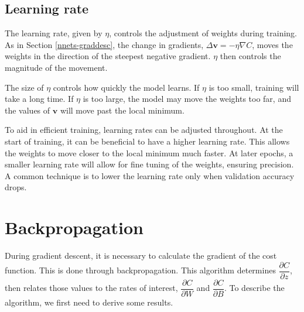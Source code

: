 %
%
%

\subsection*{Learning rate}\label{nnets-learningrate}

The learning rate, given by $\eta$, controls the adjustment of weights during training. As in Section \ref{nnets-graddesc}, the change in gradients, $\Delta\mathbf{v} = -\eta\nabla C$, moves the weights in the direction of the steepest negative gradient. $\eta$ then controls the magnitude of the movement.

The size of $\eta$ controls how quickly the model learns. If $\eta$ is too small, training will take a long time. If $\eta$ is too large, the model may move the weights too far, and the values of $\mathbf{v}$ will move past the local minimum.

To aid in efficient training, learning rates can be adjusted throughout. At the start of training, it can be beneficial to have a higher learning rate. This allows the weights to move closer to the local minimum much faster. At later epochs, a smaller learning rate will allow for fine tuning of the weights, ensuring precision. A common technique is to lower the learning rate only when validation accuracy drops.

\section{Backpropagation}\label{nnets-backprop}

During gradient descent, it is necessary to calculate the gradient of the cost function. This is done through backpropagation. This algorithm determines $\dfrac{\partial C}{\partial z}$, then relates those values to the rates of interest, $\dfrac{\partial C}{\partial W}$ and $\dfrac{\partial C}{\partial B}$. To describe the algorithm, we first need to derive some results.


